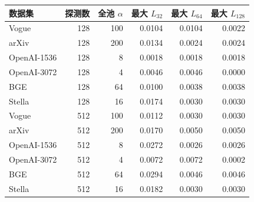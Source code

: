\begin{tabular}{@{}lrrrrr@{}}
\toprule
数据集 & 探测数 & 全池 $\alpha$ & 最大 $L_{32}$ & 最大 $L_{64}$ & 最大 $L_{128}$ \\
\midrule
Vogue & 128 & 100 & 0.0104 & 0.0104 & 0.0022 \\
arXiv & 128 & 200 & 0.0134 & 0.0024 & 0.0024 \\
OpenAI-1536 & 128 & 8 & 0.0018 & 0.0018 & 0.0018 \\
OpenAI-3072 & 128 & 4 & 0.0046 & 0.0046 & 0.0000 \\
BGE & 128 & 64 & 0.0100 & 0.0038 & 0.0038 \\
Stella & 128 & 16 & 0.0174 & 0.0030 & 0.0030 \\
Vogue & 512 & 100 & 0.0112 & 0.0030 & 0.0030 \\
arXiv & 512 & 200 & 0.0170 & 0.0050 & 0.0050 \\
OpenAI-1536 & 512 & 8 & 0.0272 & 0.0026 & 0.0026 \\
OpenAI-3072 & 512 & 4 & 0.0072 & 0.0072 & 0.0002 \\
BGE & 512 & 64 & 0.0294 & 0.0046 & 0.0046 \\
Stella & 512 & 16 & 0.0182 & 0.0030 & 0.0030 \\
\bottomrule
\end{tabular}

